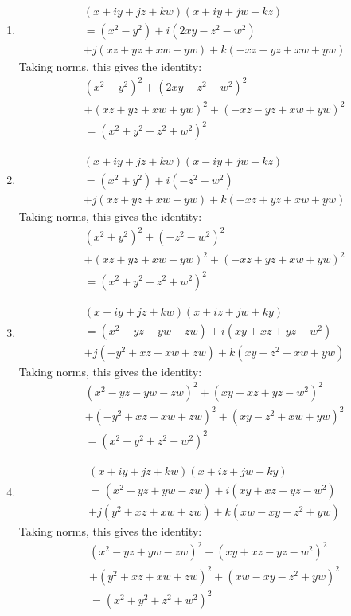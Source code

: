 \documentclass[12pt]{article}
\theoremstyle{definition}
\numberwithin{equation}{section}
\begin{document}
\begin{enumerate}[{Identity} I:]
\item
    \begin{align*}
    &(x + iy + jz + kw)(x + iy + jw - kz) \\
    &= (x^2 - y^2 ) + i(2xy - z^2 - w^2) \\
        &+ j(xz + yz + xw + yw) + k(-xz - yz + xw + yw) 
    \end{align*}
Taking norms, this gives the identity:
    \begin{align*}
    &(x^2 - y^2 )^2 + (2xy - z^2 - w^2)^2 \\
        &+ (xz + yz + xw + yw)^2 + (-xz - yz + xw + yw)^2 \\ 
    &= (x^2 + y^2 + z^2 + w^2)^2
    \end{align*}
\item
    \begin{align*}
    &(x + iy + jz + kw)(x - iy + jw - kz) \\
    &= (x^2 + y^2 ) + i(- z^2 - w^2) \\
        &+ j(xz + yz + xw - yw) + k(-xz + yz + xw + yw) 
    \end{align*}
Taking norms, this gives the identity:
    \begin{align*}
    &(x^2 + y^2 )^2 + (- z^2 - w^2)^2 \\
        &+ (xz + yz + xw - yw)^2 + (-xz + yz + xw + yw)^2 \\
    &= (x^2 + y^2 + z^2 + w^2)^2
    \end{align*}
\item
    \begin{align*}
    &(x + iy + jz + kw)(x + iz + jw + ky) \\
    &= (x^2 - yz - yw - zw ) + i(xy + xz + yz - w^2) \\
        &+ j(-y^2 + xz + xw + zw) + k(xy - z^2 + xw + yw) 
    \end{align*}
Taking norms, this gives the identity:
    \begin{align*}
    &(x^2 - yz - yw - zw )^2 + (xy + xz + yz - w^2)^2 \\
        &+ (-y^2 + xz + xw + zw)^2 + (xy - z^2 + xw + yw)^2 \\
    &= (x^2 + y^2 + z^2 + w^2)^2
    \end{align*}
\item
    \begin{align*}
    &(x + iy + jz + kw)(x + iz + jw - ky) \\
    &= (x^2 - yz + yw - zw ) + i(xy + xz - yz - w^2) \\
        &+ j(y^2 + xz + xw + zw) + k(xw - xy - z^2  + yw) 
    \end{align*}
Taking norms, this gives the identity:
    \begin{align*}
    &(x^2 - yz + yw - zw )^2 + (xy + xz - yz - w^2)^2 \\
        &+ (y^2 + xz + xw + zw)^2 + (xw - xy - z^2  + yw)^2 \\
    &= (x^2 + y^2 + z^2 + w^2)^2
    \end{align*}
\end{enumerate}
\end{document}
